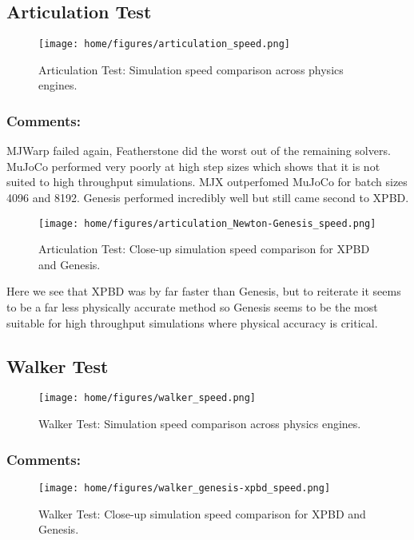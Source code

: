 \documentclass[11pt,a4paper]{article}
\begin{document}
\subsection{Articulation Test}
\begin{figure}[H]
    \centering
    \texttt{[image: home/figures/articulation\_speed.png]}
    \caption{Articulation Test: Simulation speed comparison across physics engines.}
    \label{fig:articulation_speed_comparison}
\end{figure}

\subsubsection{Comments:}
MJWarp failed again, Featherstone did the worst out of the remaining solvers. MuJoCo performed very poorly at high step sizes which shows that it is not suited to high throughput simulations. MJX outperfomed MuJoCo for batch sizes 4096 and 8192. Genesis performed incredibly well but still came second to XPBD.
\begin{figure}[H]
    \centering
    \texttt{[image: home/figures/articulation\_Newton-Genesis\_speed.png]}
    \caption{Articulation Test: Close-up simulation speed comparison for XPBD and Genesis.}
    \label{fig:articulation_speed_comparison}
\end{figure}
Here we see that XPBD was by far faster than Genesis, but to reiterate it seems to be a far less physically accurate method so Genesis seems to be the most suitable for high throughput simulations where physical accuracy is critical.

\subsection{Walker Test}
\begin{figure}[H]
    \centering
    \texttt{[image: home/figures/walker\_speed.png]}
    \caption{Walker Test: Simulation speed comparison across physics engines.}
    \label{fig:walker_speed_comparison}
\end{figure}

\subsubsection{Comments:}

\begin{figure}[H]
    \centering
    \texttt{[image: home/figures/walker\_genesis-xpbd\_speed.png]}
    \caption{Walker Test: Close-up simulation speed comparison for XPBD and Genesis.}
    \label{fig:walker_speed_comparison_xpbd_genesis}
\end{figure}
\end{document}
